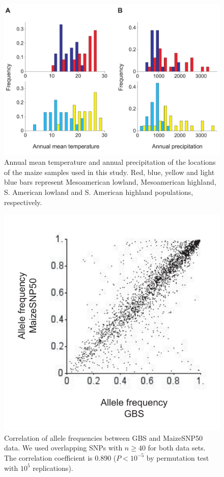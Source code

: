 \begin{figure}[h]
  \begin{center}
    \includegraphics[width=0.5\columnwidth]{fig/bioclm.pdf}
    \caption{Annual mean temperature and annual precipitation of the  locations of the maize samples used in this study.
    Red, blue, yellow and light blue bars represent Mesoamerican lowland, Mesoamerican highland, S. American lowland and S. American highland
    populations, respectively.  
    }
    \label{supp:colfreq}
  \end{center}
\end{figure}

\begin{figure}[h]
  \begin{center}
    \includegraphics[width=0.4\columnwidth]{fig/Col.pdf}
    \caption{Correlation of allele frequencies between GBS and MaizeSNP50  data.  We used overlapping SNPs with $n\geq40$ for both data sets.  The correlation coefficient is 0.890 ($P<10^{-5}$ by permutation test with $10^5$ replications).}
    \label{supp:correl_freq}
  \end{center}
\end{figure}

